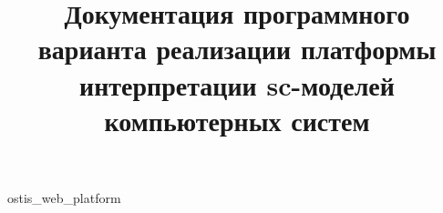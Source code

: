 \documentclass[graybox,envcountchap,sectrefs]{svmono}
\begin{document}
\DeactivateBG
\title{\centering
Документация программного варианта реализации платформы интерпретации sc-моделей компьютерных систем}
\maketitle

\normalsize

\setcounter{page}{3}

\ActivateBG

\addtocounter{chapter}{-1}

\begin{SCn}
{ostis_web_platform}

\end{SCn}


\backmatter
\end{document}
